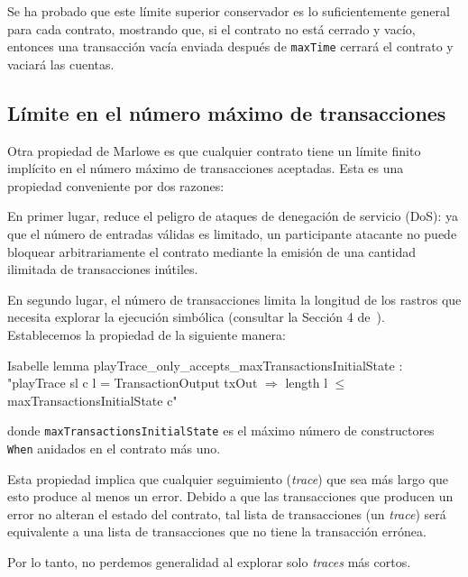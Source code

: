\documentclass[12pt]{book}
\begin{document}
Se ha probado que este límite superior conservador es lo suficientemente general para cada contrato, mostrando que, si el contrato no está cerrado y vacío, entonces una transacción vacía enviada después de \texttt{maxTime} cerrará el contrato y vaciará las cuentas.

\subsection{Límite en el número máximo de transacciones}

Otra propiedad de Marlowe es que cualquier contrato tiene un límite finito implícito en el número máximo de transacciones aceptadas. Esta es una propiedad conveniente por dos razones:

En primer lugar, reduce el peligro de ataques de denegación de servicio (DoS): ya que el número de entradas válidas es limitado, un participante atacante no puede bloquear arbitrariamente el contrato mediante la emisión de una cantidad ilimitada de transacciones inútiles.

En segundo lugar, el número de transacciones limita la longitud de los rastros que necesita explorar la ejecución simbólica (consultar la Sección 4 de~\cite{implementing_financial_contracts_on_blockchain}). Establecemos la propiedad de la siguiente manera:

\begin{code}[title=Lema que verifica que \textit{playTrace} no supere el número máximo de transacciones.]{Isabelle}
lemma playTrace_only_accepts_maxTransactionsInitialState :
"playTrace sl c l = TransactionOutput txOut
    $\Longrightarrow$ length l $\leq$ maxTransactionsInitialState c"
\end{code}

donde \texttt{maxTransactionsInitialState} es el máximo número de constructores \texttt{When} anidados en el contrato más uno.

Esta propiedad implica que cualquier seguimiento (\textit{trace}) que sea más largo que esto produce al menos un error. Debido a que las transacciones que producen un error no alteran el estado del contrato, tal lista de transacciones (un \textit{trace}) será equivalente a una lista de transacciones que no tiene la transacción errónea.

Por lo tanto, no perdemos generalidad al explorar solo \textit{traces} más cortos.


\end{document}
